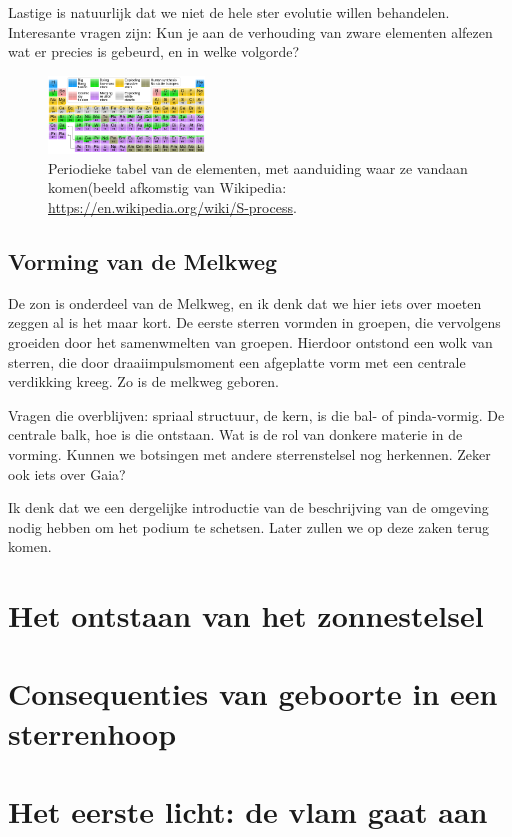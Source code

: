 \documentclass[11pt,fleqn]{book} %
\begin{document}
Lastige is natuurlijk dat we niet de hele ster evolutie willen
behandelen.  Interesante vragen zijn: Kun je aan de verhouding van
zware elementen alfezen wat er precies is gebeurd, en in welke
volgorde?

\begin{figure}[h]
    \centering
    \includegraphics[width=0.37\textwidth]{Pictures/periodictable.png}
    \caption{Periodieke tabel van de elementen, met aanduiding waar ze vandaan komen(beeld afkomstig van Wikipedia:
      \url{https://en.wikipedia.org/wiki/S-process}.
      }
    \label{fig:periodictable}
\end{figure}

\section{Vorming van de Melkweg}

De zon is onderdeel van de Melkweg, en ik denk dat we hier iets over
moeten zeggen al is het maar kort.  De eerste sterren vormden in
groepen, die vervolgens groeiden door het samenwmelten van
groepen. Hierdoor ontstond een wolk van sterren, die door
draaiimpulsmoment een afgeplatte vorm met een centrale verdikking
kreeg. Zo is de melkweg geboren.

Vragen die overblijven: spriaal structuur, de kern, is die bal- of
pinda-vormig. De centrale balk, hoe is die ontstaan. Wat is de rol van
donkere materie in de vorming. Kunnen we botsingen met andere
sterrenstelsel nog herkennen. Zeker ook iets over Gaia?

Ik denk dat we een dergelijke introductie van de beschrijving van de
omgeving nodig hebben om het podium te schetsen. Later zullen we op
deze zaken terug komen.


\chapter{Het ontstaan van het zonnestelsel}
\chapter{Consequenties van geboorte in een sterrenhoop}
\chapter{Het eerste licht: de vlam gaat aan}
\end{document}
